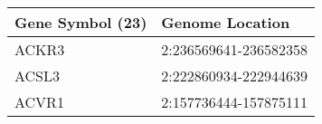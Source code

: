 \begin{tabular}{ll}
\toprule
Gene Symbol (23) &       Genome Location \\
\midrule
           ACKR3 & 2:236569641-236582358 \\
           ACSL3 & 2:222860934-222944639 \\
           ACVR1 & 2:157736444-157875111 \\
\bottomrule
\end{tabular}
